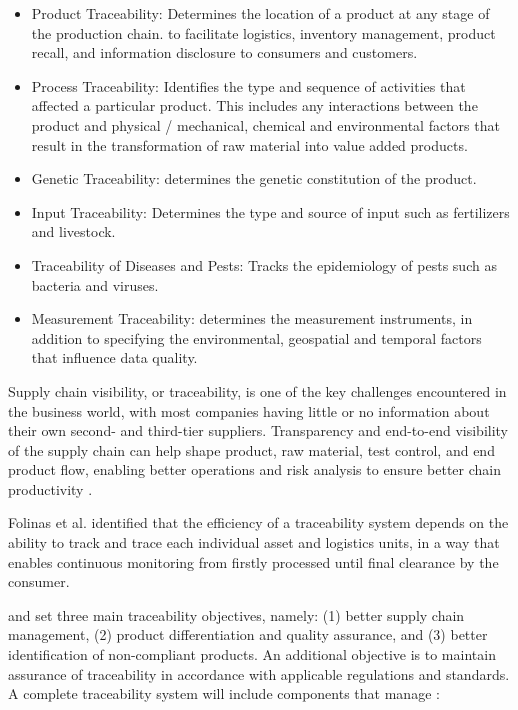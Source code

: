 \begin{itemize}
\item Product Traceability: Determines the location of a product at any stage of the production chain. to facilitate logistics, inventory management, product recall, and information disclosure to consumers and customers.
\item Process Traceability: Identifies the type and sequence of activities that affected a particular product. This includes any interactions between the product and physical / mechanical, chemical and environmental factors that result in the transformation of raw material into value added products.
\item Genetic Traceability: determines the genetic constitution of the product.
\item Input Traceability: Determines the type and source of input such as fertilizers and livestock.
\item Traceability of Diseases and Pests: Tracks the epidemiology of pests such as bacteria and viruses.
\item Measurement Traceability: determines the measurement instruments, in addition to specifying the environmental, geospatial and temporal factors that influence data quality.
\end{itemize}

Supply chain visibility, or traceability, is one of the key challenges encountered in the business world, with most companies having little or no information about their own second- and third-tier suppliers. Transparency and end-to-end visibility of the supply chain can help shape product, raw material, test control, and end product flow, enabling better operations and risk analysis to ensure better chain productivity \cite{abeyratne2016blockchain}.

Folinas et al. \cite{folinas2006traceability} identified that the efficiency of a traceability system depends on the ability to track and trace each individual asset and logistics units, in a way that enables continuous monitoring from firstly processed until final clearance by the consumer.

 and  set three main traceability objectives, namely: (1) better supply chain management, (2) product differentiation and quality assurance, and (3) better identification of non-compliant products. An additional objective is to maintain assurance of traceability in accordance with applicable regulations and standards. A complete traceability system will include components that manage \cite{vargas2017trazabilidad}:

